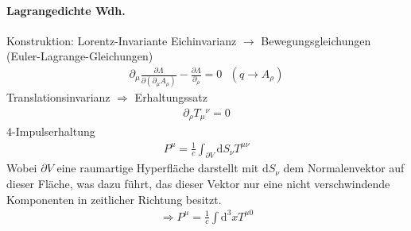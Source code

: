 \documentclass[a4paper]{article}
\begin{document}
\paragraph{Lagrangedichte Wdh.}
Konstruktion: Lorentz-Invariante
Eichinvarianz
$\rightarrow$ Bewegungsgleichungen (Euler-Lagrange-Gleichungen)
\begin{align}
\partial_\mu \frac{\partial \Lambda}{\partial(\partial_\mu
A_\rho)}-\frac{\partial \Lambda}{\partial_\rho}=0 \text{    } (q\rightarrow
A_\rho)
\end{align}
Translationsinvarianz $\Rightarrow$ Erhaltungssatz
\begin{align}
\partial_\rho T_\mu{}^\nu=0
\end{align}
4-Impulserhaltung
\begin{align}
P^\mu=\frac{1}{c}\int_{\partial V} \mathrm{d}S_\nu T^{\mu\nu} 
\end{align}
Wobei $\partial V$ eine raumartige Hyperfläche darstellt mit $\mathrm{d}S_\nu$ dem
Normalenvektor auf dieser Fläche, was dazu führt, das dieser Vektor nur eine
nicht verschwindende Komponenten in zeitlicher Richtung besitzt.
\begin{align}
\Rightarrow P^\mu=\frac{1}{c}\int \mathrm{d}^3x T^{\mu0}
\end{align}
\end{document}
